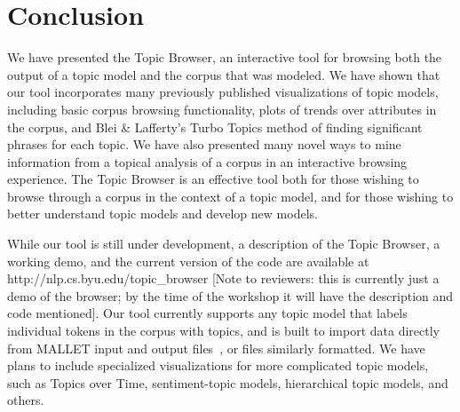 \documentclass{article}
\begin{document}
\section{Conclusion}

We have presented the Topic Browser, an interactive tool for browsing both the
output of a topic model and the corpus that was modeled.  We have shown that
our tool incorporates many previously published visualizations of topic models,
including basic corpus browsing functionality, plots of trends over attributes
in the corpus, and Blei \& Lafferty's Turbo Topics method of finding
significant phrases for each topic.  We have also presented many novel ways to
mine information from a topical analysis of a corpus in an interactive browsing
experience.  The Topic Browser is an effective tool both for those wishing to
browse through a corpus in the context of a topic model, and for those wishing
to better understand topic models and develop new models.


While our tool is still under development, a description of the Topic Browser,
a working demo, and the current version of the code are available at
http://nlp.cs.byu.edu/topic\_browser [Note to reviewers: this is currently just
a demo of the browser; by the time of the workshop it will have the description
and code mentioned].  Our tool currently supports any topic model that labels
individual tokens in the corpus with topics, and is built to import data
directly from MALLET input and output files~\cite{mallet}, or files similarly
formatted.  We have plans to include specialized visualizations for more
complicated topic models, such as Topics over Time, sentiment-topic models,
hierarchical topic models, and others.



\end{document}
